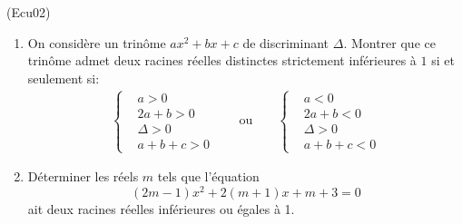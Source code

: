 \begin{tiny}(Ecu02)\end{tiny}\label{Ecu02}
\begin{enumerate}
  \item On considère un trinôme $ax^2+bx+c$ de discriminant $\Delta$. Montrer que ce trinôme admet deux racines réelles distinctes strictement inférieures à $1$ si et seulement si:
\begin{align*}
\left\lbrace  
\begin{aligned}
  &a>0 \\ &2a+b >0 \\ &\Delta >0 \\ &a+b+c >0
\end{aligned}
\right. 
& &\text{ ou }& &
\left\lbrace  
\begin{aligned}
  &a<0 \\ &2a+b <0 \\ &\Delta >0 \\ &a+b+c <0
\end{aligned}
\right. 
\end{align*}
\item Déterminer les réels $m$ tels que l'équation
\begin{displaymath}
(2m-1)x^{2}+2(m+1)x+m+3=0  
\end{displaymath}
ait deux racines r{\'e}elles inférieures ou égales à 1.
\end{enumerate}